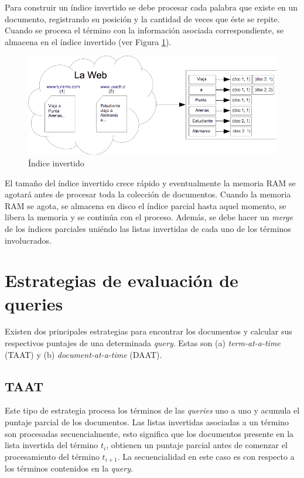 Para construir un índice invertido se debe procesar cada palabra que existe en un documento, registrando su posición y la cantidad de veces que éste se repite. Cuando se procesa el término con la información asociada correspondiente, se almacena en el índice invertido (ver Figura \ref{fig:invertedindex}).

\begin{figure}[tp]
\centering
\includegraphics[scale=.75]{images/invertedindex.png}
\caption{\'Indice invertido}
\label{fig:invertedindex}
\end{figure}

El tamaño del índice invertido crece rápido y eventualmente la memoria RAM se agotará antes de procesar toda la colección de documentos. Cuando la memoria RAM se agota, se almacena en disco el índice parcial hasta aquel momento, se libera la memoria y se continúa con el proceso. Además, se debe hacer un \textit{merge} de los índices parciales uniéndo las listas invertidas de cada uno de los términos involucrados.

\section{Estrategias de evaluaci\'on de queries}
\label{marco:eeq}
Existen dos principales estrategias para encontrar los documentos y calcular sus respectivos puntajes de una determinada \textit{query}. Estas son (a) \textit{term-at-a-time} (TAAT) y (b) \textit{document-at-a-time} (DAAT).

\subsection{TAAT}
Este tipo de estrategia procesa los términos de las \textit{queries} uno a uno y acumula el puntaje parcial de los documentos. Las listas invertidas asociadas a un término son procesadas secuencialmente, esto significa que los documentos presente en la lista invertida del término $t_{i}$, obtienen un puntaje parcial antes de comenzar el procesamiento del término $t_{i+1}$. La secuencialidad en este caso es con respecto a los términos contenidos en la \textit{query}.


